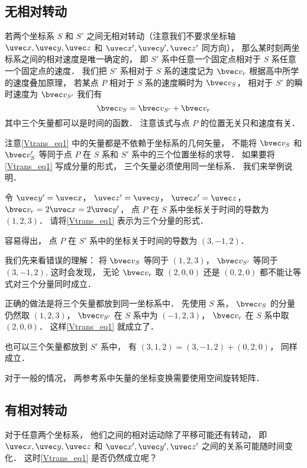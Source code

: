 


\subsection{无相对转动}
若两个坐标系 $S$ 和 $S'$ 之间无相对转动（注意我们不要求坐标轴 $\uvec x, \uvec y, \uvec z$ 和 $\uvec x', \uvec y', \uvec z'$ 同方向）， 那么某时刻两坐标系之间的相对速度是唯一确定的， 即 $S'$ 系中任意一个固定点相对于 $S$ 系任意一个固定点的速度． 我们把 $S'$ 系相对于 $S$ 系的速度记为 $\bvec v_r$ 根据高中所学的速度叠加原理， 若某点 $P$ 相对于 $S$ 系的速度瞬时为 $\bvec v_S$， 相对于 $S'$ 的瞬时速度为 $\bvec v_{S'}$ 我们有
\begin{equation}\label{Vtrans_eq1}
\bvec v_{S} = \bvec v_{S'} + \bvec v_r
\end{equation}
其中三个矢量都可以是时间的函数． 注意该式与点 $P$ 的位置无关只和速度有关．

注意\autoref{Vtrans_eq1} 中的矢量都是不依赖于坐标系的几何矢量， 不能将 $\bvec v_S$ 和 $\bvec v_S'$ 等同于点 $P$ 在 $S$ 系和 $S'$ 系中的三个位置坐标的求导． 如果要将\autoref{Vtrans_eq1} 写成分量的形式， 三个矢量必须使用同一坐标系． 我们来举例说明．

\begin{example}{}
令 $\uvec y' = \uvec x$， $\uvec z' = \uvec y$， $\uvec x' = \uvec z$， $\bvec v_r = 2\uvec x = 2\uvec y'$， 点 $P$ 在 $S$ 系中坐标关于时间的导数为 $(1, 2, 3)$． 请将\autoref{Vtrans_eq1} 表示为三个分量的形式．

容易得出， 点 $P$ 在 $S'$ 系中的坐标关于时间的导数为 $(3, -1, 2)$．

我们先来看错误的理解： 将 $\bvec v_S$ 等同于 $(1, 2, 3)$， $\bvec v_{S'}$ 等同于 $(3, -1, 2)$,  这时会发现， 无论 $\bvec v_r$ 取 $(2, 0, 0)$ 还是 $(0, 2, 0)$ 都不能让等式对三个分量同时成立．

正确的做法是将三个矢量都放到同一坐标系中． 先使用 $S$ 系， $\bvec v_S$ 的分量仍然取 $(1, 2, 3)$， $\bvec v_{S'}$ 在 $S$ 系中为 $(-1, 2, 3)$， $\bvec v_r$ 在 $S$ 系中取 $(2, 0, 0)$． 这样\autoref{Vtrans_eq1} 就成立了．

也可以三个矢量都放到 $S'$ 系中， 有 $(3, 1, 2) = (3, -1, 2) + (0, 2, 0)$， 同样成立．
\end{example}

对于一般的情况， 两参考系中矢量的坐标变换需要使用空间旋转矩阵．

\subsection{有相对转动}
对于任意两个坐标系， 他们之间的相对运动除了平移可能还有转动， 即 $\uvec x, \uvec y, \uvec z$ 和 $\uvec x', \uvec y', \uvec z'$ 之间的关系可能随时间变化． 这时\autoref{Vtrans_eq1} 是否仍然成立呢？

